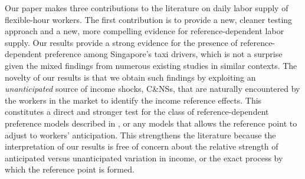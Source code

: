 \documentclass[reviewmode]{restud}
\begin{document}
Our paper makes three contributions to the literature on daily labor supply of flexible-hour workers. The first contribution is to provide a new, cleaner testing approach and a new, more compelling evidence for reference-dependent labor supply. Our results provide a strong evidence for the presence of reference-dependent preference among Singapore's taxi drivers, which is not a surprise given the mixed findings from numerous existing studies in similar contexts. The novelty of our results is that we obtain such findings by exploiting an \textit{unanticipated}  source of income shocks, C\&NSs, that are naturally encountered by the workers in the market to identify the income reference effects. This constitutes a direct and stronger test for the class of reference-dependent preference models described in \citet{kHoszegi2006model}, or any models that allows the reference point to adjust to workers' anticipation. This strengthens the literature because the interpretation of our results is free of concern about the relative strength of anticipated versus unanticipated variation in income, or the exact process by which the reference point is formed.
\end{document}
